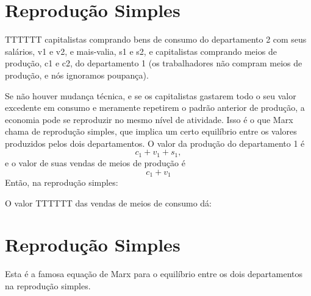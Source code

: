 \section{Reprodução Simples}
 \par 
TTTTTT capitalistas comprando bens de consumo do departamento {\color{blue}2} com seus salários, v1 e v2, e mais-valia, s1 e s2, e capitalistas comprando meios de produção, c1 e c2, do departamento {\color{blue}1} (os trabalhadores não compram meios de produção, e nós ignoramos poupança).
 \par 
Se não houver mudança técnica, e se os capitalistas gastarem todo o seu valor excedente em consumo e meramente repetirem o padrão anterior de produção, a economia pode se reproduzir no mesmo nível de atividade. Isso é o que Marx chama de reprodução simples, que implica um certo equilíbrio entre os valores produzidos pelos dois departamentos. O valor da produção do departamento {\color{blue}1} é  $$ c_{1} + v_{1} + s_{1},$$   e o valor de suas vendas de meios de produção é  $$ c_{1} + v_{1} $$   Então, na reprodução simples:
 \par 
O valor TTTTTT das vendas de meios de consumo dá:
 \par 
\section{Reprodução Simples}
 \par 
Esta é a famosa equação de Marx para o equilíbrio entre os dois departamentos na reprodução simples.
 \par 

